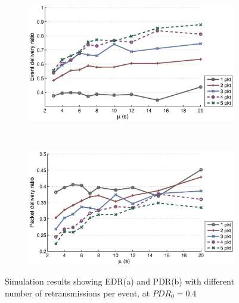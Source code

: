 \begin{figure}[p]
    \centering
    \begin{subfigure}[t]{0.7\textwidth}
        \centering
        \includegraphics[width=\textwidth] {../../sw/pc/matlab/simulation-result/retrans-count-edr-20min-pdr0.4.eps}
        \caption{}
    \end{subfigure} 
    \\
    \begin{subfigure}[t]{0.7\textwidth}
        \centering
        \includegraphics[width=\textwidth] {../../sw/pc/matlab/simulation-result/retrans-count-pdr-20min-pdr0.4.eps}
        \caption{}
    \end{subfigure}
    \caption[EDR and PDR with different transmission redundancy, $PDR_0 = 0.4$]{Simulation results showing EDR(a) and PDR(b) with different number of retransmissions per event, at $PDR_0 = 0.4$}\label{fig:retrans-lambda-0.4}
\end{figure}


